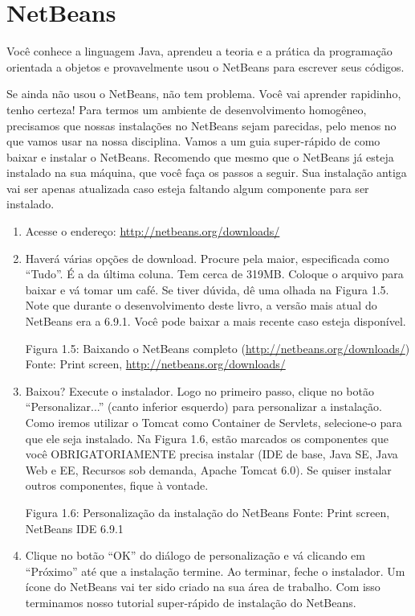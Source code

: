 \section{NetBeans}

Você conhece a linguagem Java, aprendeu a teoria e a prática da programação orientada a objetos e provavelmente usou o NetBeans para escrever seus códigos.

Se ainda não usou o NetBeans, não tem problema. Você vai aprender rapidinho, tenho certeza! Para termos um ambiente de desenvolvimento homogêneo, precisamos que nossas instalações no NetBeans sejam parecidas, pelo menos no que vamos usar na nossa disciplina. Vamos a um guia super-rápido de como baixar e instalar o NetBeans. Recomendo que mesmo que o NetBeans já esteja instalado na sua máquina, que você faça os passos a seguir. Sua instalação antiga vai ser apenas atualizada caso esteja faltando algum componente para ser instalado.

\begin{enumerate}

    \item Acesse o endereço: \url{http://netbeans.org/downloads/}
    
    \item Haverá várias opções de download. Procure pela maior, especificada como ``Tudo''. É a da última coluna. Tem cerca de 319MB. Coloque o arquivo para baixar e vá tomar um café. Se tiver dúvida, dê uma olhada na Figura 1.5. Note que durante o desenvolvimento deste livro, a versão mais atual do NetBeans era a 6.9.1. Você pode baixar a mais recente caso esteja disponível.
    
    Figura 1.5: Baixando o NetBeans completo (\url{http://netbeans.org/downloads/})
    Fonte: Print screen, \url{http://netbeans.org/downloads/}
    
    \item Baixou? Execute o instalador. Logo no primeiro passo, clique no botão ``Personalizar...'' (canto inferior esquerdo) para personalizar a instalação. Como iremos utilizar o Tomcat como Container de Servlets, selecione-o para que ele seja instalado. Na Figura 1.6, estão marcados os componentes que você OBRIGATORIAMENTE precisa instalar (IDE de base, Java SE, Java Web e EE, Recursos sob demanda, Apache Tomcat 6.0). Se quiser instalar outros componentes, fique à vontade.
    
    Figura 1.6: Personalização da instalação do NetBeans
    Fonte: Print screen, NetBeans IDE 6.9.1
    
    \item Clique no botão ``OK'' do diálogo de personalização e vá clicando em ``Próximo'' até que a instalação termine. Ao terminar, feche o instalador. Um ícone do NetBeans vai ter sido criado na sua área de trabalho. Com isso terminamos nosso tutorial super-rápido de instalação do NetBeans.
    
\end{enumerate}

